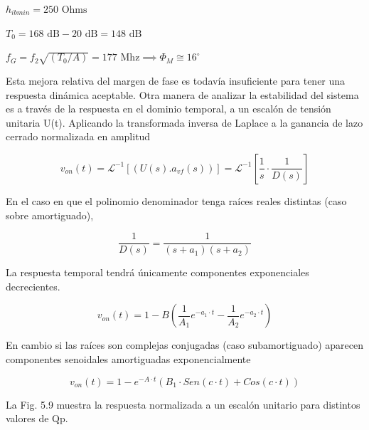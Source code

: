 $h_{ibmin} = 250 \text{ Ohms}$

$T_0 = 168 \text{ dB} - 20 \text{ dB} = 148 \text{ dB}$

$f_G = f_2 \sqrt{(T_0/A)} = 177 \text{ Mhz} \implies \Phi_M \cong 16^\circ$

Esta mejora relativa del margen de fase es todavía insuficiente para tener una respuesta dinámica aceptable.
Otra manera de analizar la estabilidad del sistema es a través de la respuesta en el dominio temporal, a un escalón de tensión unitaria U(t). Aplicando la transformada inversa de Laplace a la ganancia de lazo cerrado normalizada en amplitud

\begin{equation}
    v_{on}(t) = \mathcal{L}^{-1} [ ( U(s) . a_{vf}(s) ) ] = \mathcal{L}^{-1} \left[ \frac{1}{s} \cdot \frac{1}{D(s)} \right] \tag{5.17} \label{eq:5.17}
\end{equation}

En el caso en que el polinomio denominador tenga raíces reales distintas (caso sobre amortiguado),

\begin{equation*}
    \frac{1}{D(s)} = \frac{1}{(s + a_1)(s + a_2)}
\end{equation*}

La respuesta temporal tendrá únicamente componentes exponenciales decrecientes.

\begin{equation}
    v_{on}(t) = 1 - B \left( \frac{1}{A_1} e^{-a_1 \cdot t} - \frac{1}{A_2} e^{-a_2 \cdot t} \right) \tag{5.18} \label{eq:5.18}
\end{equation}

En cambio si las raíces son complejas conjugadas (caso subamortiguado) aparecen componentes senoidales amortiguadas exponencialmente

\begin{equation}
    v_{on}(t) = 1 - e^{-A \cdot t} ( B_1 \cdot Sen(c \cdot t) + Cos(c \cdot t) ) \tag{5.19} \label{eq:5.19}
\end{equation}

La Fig. 5.9 muestra la respuesta normalizada a un escalón unitario para distintos valores de Qp.

